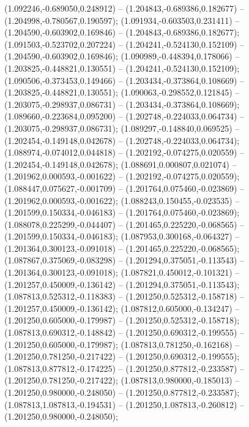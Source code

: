  (1.092246,-0.689050,0.248912) -- (1.204843,-0.689386,0.182677) -- (1.204998,-0.780567,0.190597);
 (1.091934,-0.603503,0.231411) -- (1.204590,-0.603902,0.169846) -- (1.204843,-0.689386,0.182677);
 (1.091503,-0.523702,0.207224) -- (1.204241,-0.524130,0.152109) -- (1.204590,-0.603902,0.169846);
 (1.090989,-0.448394,0.178066) -- (1.203825,-0.448821,0.130551) -- (1.204241,-0.524130,0.152109);
 (1.090506,-0.373453,0.149466) -- (1.203434,-0.373864,0.108669) -- (1.203825,-0.448821,0.130551);
 (1.090063,-0.298552,0.121845) -- (1.203075,-0.298937,0.086731) -- (1.203434,-0.373864,0.108669);
 (1.089660,-0.223684,0.095200) -- (1.202748,-0.224033,0.064734) -- (1.203075,-0.298937,0.086731);
 (1.089297,-0.148840,0.069525) -- (1.202454,-0.149148,0.042678) -- (1.202748,-0.224033,0.064734);
 (1.088974,-0.074012,0.044818) -- (1.202192,-0.074275,0.020559) -- (1.202454,-0.149148,0.042678);
 (1.088691,0.000807,0.021074) -- (1.201962,0.000593,-0.001622) -- (1.202192,-0.074275,0.020559);
 (1.088447,0.075627,-0.001709) -- (1.201764,0.075460,-0.023869) -- (1.201962,0.000593,-0.001622);
 (1.088243,0.150455,-0.023535) -- (1.201599,0.150334,-0.046183) -- (1.201764,0.075460,-0.023869);
 (1.088078,0.225299,-0.044407) -- (1.201465,0.225220,-0.068565) -- (1.201599,0.150334,-0.046183);
 (1.087953,0.300168,-0.064327) -- (1.201364,0.300123,-0.091018) -- (1.201465,0.225220,-0.068565);
 (1.087867,0.375069,-0.083298) -- (1.201294,0.375051,-0.113543) -- (1.201364,0.300123,-0.091018);
 (1.087821,0.450012,-0.101321) -- (1.201257,0.450009,-0.136142) -- (1.201294,0.375051,-0.113543);
 (1.087813,0.525312,-0.118383) -- (1.201250,0.525312,-0.158718) -- (1.201257,0.450009,-0.136142);
 (1.087812,0.605000,-0.134247) -- (1.201250,0.605000,-0.179987) -- (1.201250,0.525312,-0.158718);
 (1.087813,0.690312,-0.148842) -- (1.201250,0.690312,-0.199555) -- (1.201250,0.605000,-0.179987);
 (1.087813,0.781250,-0.162168) -- (1.201250,0.781250,-0.217422) -- (1.201250,0.690312,-0.199555);
 (1.087813,0.877812,-0.174225) -- (1.201250,0.877812,-0.233587) -- (1.201250,0.781250,-0.217422);
 (1.087813,0.980000,-0.185013) -- (1.201250,0.980000,-0.248050) -- (1.201250,0.877812,-0.233587);
 (1.087813,1.087813,-0.194531) -- (1.201250,1.087813,-0.260812) -- (1.201250,0.980000,-0.248050);
